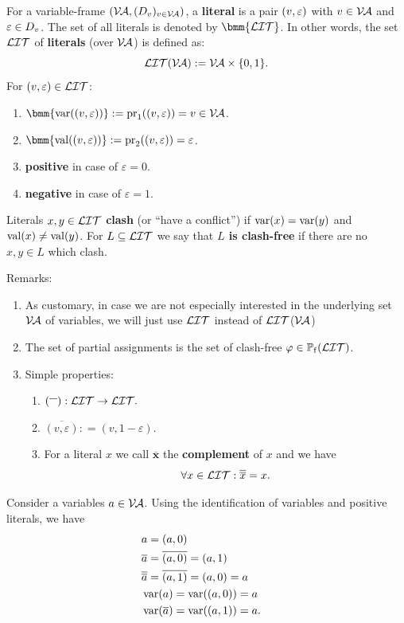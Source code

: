 \documentclass[]{book}
\begin{document}
\begin{defi}\label{def:litdervar}
      For a variable-frame $(\mathcal{V\hspace{-0.1em}A}, (D_v)_{v \in \mathcal{V\hspace{-0.1em}A}})$, a \textbf{literal} is a pair $(v,\varepsilon)$ with $v \in \mathcal{V\hspace{-0.1em}A}$ and $\varepsilon \in D_v$. The set of all literals is denoted by 
	  $\bmm{\Lit}$. In other words, the set $\mathcal{LIT}$ of \textbf{literals} (over $\mathcal{V\hspace{-0.1em}A}$) is defined as:
      $$\mathcal{LIT}( \mathcal{V\hspace{-0.1em}A}): = \mathcal{V\hspace{-0.1em}A} \times \{0,1\}.$$
      For $(v,\varepsilon) \in \mathcal{LIT}$:
      \begin{enumerate}
            \item $\bmm{\var((v,\ve))} := \proj_1((v,\ve)) = v \in \Va$.
            \item $\bmm{\val((v,\ve))} := \proj_2((v,\ve)) = \ve$.
            \item \textbf{positive} in case of $\varepsilon = 0$.
            \item \textbf{negative} in case of $\varepsilon = 1$.
      \end{enumerate}
      Literals $x, y \in \mathcal{LIT}$ \textbf{clash} (or ``have a conflict'') if $\operatorname{var}(x) = \operatorname{var}(y)$ and $\operatorname{val}(x) \ne \operatorname{val}(y)$. For $L \subseteq \mathcal{LIT}$ we say that 
	  \textbf{$L$ is clash-free} if there are no $x, y \in L$ which clash.
\end{defi}
Remarks:
\begin{enumerate}
      \item As customary, in case we are not especially interested in the underlying set   $\mathcal{V\hspace{-0.1em}A}$ of variables, we will just use  $\mathcal{LIT}$ instead of $\mathcal{LIT}$($\mathcal{V\hspace{-0.1em}A}$)
      \item The set of partial assignments is the set of clash-free $\varphi \in \operatorname{\mathbb{P}_f}(\mathcal{LIT})$.
      \item Simple properties:
      \begin{enumerate}
            \item $({}^{\overline{~~}}): \mathcal{LIT} \to  \mathcal{LIT}.$
            \item $\overline{(v, \varepsilon)}: = (v, 1-\varepsilon).$
            \item For a literal $x$ we call $\overline{{\bm x}}$ the \textbf{complement} of $x$ and we have
            $$\forall x \in \mathcal{LIT}: \overline{\overline{x}} = x.$$
      \end{enumerate}
\end{enumerate}
\begin{examp}\label{}
      Consider a variables $a\in  \mathcal{V\hspace{-0.1em}A}$. Using the identification of variables and positive literals, we have
      \begin{eqnarray*}
            &a = (a,0)& \\
            &\overline{a} = \overline{(a,0)} = (a,1)&\\
            &\overline{\overline{a}} = \overline{(a,1)} = (a,0) = a&\\
            &\operatorname{var}(a) = \operatorname{var}((a,0)) = a& \\
            &\operatorname{var}(\overline{a}) = \operatorname{var}((a,1)) = a. &
      \end{eqnarray*}
\end{examp}
\end{document}
